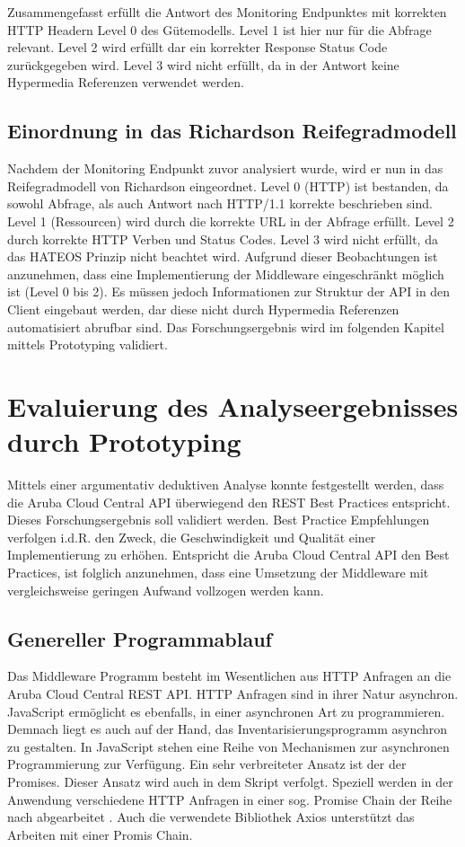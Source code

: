 Zusammengefasst erfüllt die Antwort des Monitoring Endpunktes mit korrekten HTTP Headern Level 0 des Gütemodells. Level 1 ist hier nur für die Abfrage relevant. Level 2 wird erfüllt dar ein korrekter Response Status Code zurückgegeben wird. Level 3 wird nicht erfüllt, da in der Antwort keine Hypermedia Referenzen verwendet werden.

\subsection{Einordnung in das Richardson Reifegradmodell}

Nachdem der Monitoring Endpunkt zuvor analysiert wurde, wird er nun in das Reifegradmodell von Richardson eingeordnet. Level 0 (HTTP) ist bestanden, da sowohl Abfrage, als auch Antwort nach HTTP/1.1 korrekte beschrieben sind. Level 1 (Ressourcen) wird durch die korrekte URL in der Abfrage erfüllt. Level 2 durch korrekte HTTP Verben und Status Codes. Level 3 wird nicht erfüllt, da das HATEOS Prinzip nicht beachtet wird. Aufgrund dieser Beobachtungen ist anzunehmen, dass eine Implementierung der Middleware eingeschränkt möglich ist (Level 0 bis 2). Es müssen jedoch Informationen zur Struktur der API in den Client eingebaut werden, dar diese nicht durch Hypermedia Referenzen automatisiert abrufbar sind. Das Forschungsergebnis wird im folgenden Kapitel mittels Prototyping validiert.

\section{Evaluierung des Analyseergebnisses durch Prototyping}

Mittels einer argumentativ deduktiven Analyse konnte festgestellt werden, dass die Aruba Cloud Central API überwiegend den REST Best Practices entspricht. Dieses Forschungsergebnis soll validiert werden. Best Practice Empfehlungen verfolgen i.d.R. den Zweck, die Geschwindigkeit und Qualität einer Implementierung zu erhöhen. Entspricht die Aruba Cloud Central API den Best Practices, ist folglich anzunehmen, dass eine Umsetzung der Middleware mit vergleichsweise geringen Aufwand vollzogen werden kann.

\subsection{Genereller Programmablauf}

Das Middleware Programm besteht im Wesentlichen aus HTTP Anfragen an die Aruba Cloud Central REST API. HTTP Anfragen sind in ihrer Natur asynchron. JavaScript ermöglicht es ebenfalls, in einer asynchronen Art zu programmieren. Demnach liegt es auch auf der Hand, das Inventarisierungsprogramm asynchron zu gestalten. In JavaScript stehen eine Reihe von Mechanismen zur asynchronen Programmierung zur Verfügung. Ein sehr verbreiteter Ansatz ist der der Promises. Dieser Ansatz wird auch in dem Skript verfolgt. Speziell werden in der Anwendung verschiedene HTTP Anfragen in einer sog. Promise Chain der Reihe nach abgearbeitet . Auch die verwendete Bibliothek Axios unterstützt das Arbeiten mit einer Promis Chain. 

